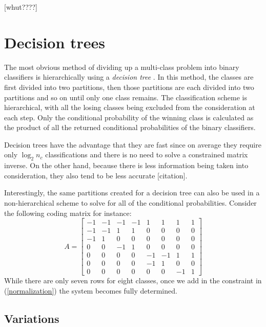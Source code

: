 \documentclass{article}
\begin{document}
[whut????]


\section{Decision trees}

The most obvious method of dividing up a multi-class problem into binary
classifiers is hierarchically using a {\it decision tree} 
\citep{Cheong_etal2004, Lee_Oh2003}.
In this method, the classes are first divided into two partitions, then
those partitions are each divided into two partitions and so on until only
one class remains. The classification scheme is hierarchical, with all the
losing classes being excluded from the consideration at each step.
Only the conditional probability of the winning class is calculated as the
product of all the returned conditional probabilities of the binary
classifiers.

Decision trees have the advantage that they are fast since on average they
require only $\log_2 n_c$ classifications and there is no need to solve a 
constrained matrix inverse. On the other hand, because there is less
information being taken into consideration, they also tend to be less
accurate [citation].

Interestingly, the same partitions created for a decision tree can also
be used in a non-hierarchical scheme
to solve for all of the conditional probabilities. Consider the following
coding matrix for instance:
\begin{equation}
A = 
\begin{bmatrix}
-1 & -1 & -1 & -1 & 1 & 1 & 1 & 1 \\
-1 & -1 & 1 & 1 & 0 & 0 & 0 & 0 \\
-1 & 1 & 0 & 0 & 0 & 0 & 0 & 0 \\
0 & 0 & -1 & 1 & 0 & 0 & 0 & 0 \\
0 & 0 & 0 & 0 & -1 & -1 & 1 & 1 \\
0 & 0 & 0 & 0 & -1 & 1 & 0 & 0 \\
0 & 0 & 0 & 0 & 0 & 0 & -1 & 1
\end{bmatrix}
\end{equation}
While there are only seven rows for eight classes, 
once we add in the constraint in (\ref{normalization}) the system becomes 
fully determined.

\subsection{Variations}
\end{document}
